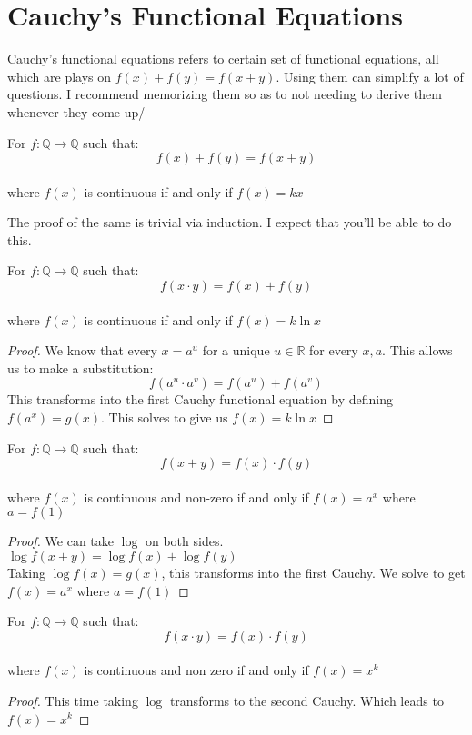 \section{Cauchy's Functional Equations}
Cauchy's functional equations refers to certain set of functional equations, all which are plays on $f(x)+f(y)=f(x+y)$. Using them can simplify a lot of questions. I recommend memorizing them so as to not needing to derive them whenever they come up/\\
\begin{theorem}
    For  $f : \mathbb{Q} \to \mathbb{Q}$ such that:\\
    \[f(x)+f(y)=f(x+y)\]\\
where $f(x)$ is continuous if and only if $f(x)=kx$
\end{theorem}
The proof of the same is trivial via induction. I expect that you'll be able to do this.\\
\begin{theorem}
    For  $f : \mathbb{Q} \to \mathbb{Q}$ such that:\\
    \[f(x \cdot y)=f(x)+f(y)\]\\
where $f(x)$ is continuous if and only if $f(x)=k \ln{x}$
\end{theorem}
\begin{proof}
    We know that every $x=a^u$ for a unique $u\in \mathbb{R}$  for every $x,a$. This allows us to make a substitution:\\
    \[ f(a^u \cdot a^v)=f(a^u)+f(a^v)\]
    This transforms into the first Cauchy functional equation by defining $f(a^x)=g(x)$. This solves to give us $f(x)=k\ln{x}$
\end{proof}
\begin{theorem}
    For  $f : \mathbb{Q} \to \mathbb{Q}$ such that:\\
    \[f(x + y)=f(x)\cdot f(y)\]\\
where $f(x)$ is continuous and non-zero if and only if $f(x)=a^x$ where $a=f(1)$
\end{theorem}
\begin{proof}
    We can take $\log$ on both sides.\\
    $\log{f(x+y)}=\log{f(x)}+\log{f(y)}$\\
    Taking $\log{f(x)}=g(x)$, this transforms into the first Cauchy. We solve to get $f(x)=a^x$ where $a=f(1)$
\end{proof}
\begin{theorem}
    For  $f : \mathbb{Q} \to \mathbb{Q}$ such that:\\
    \[f(x \cdot y)=f(x)\cdot f(y)\]\\
where $f(x)$ is continuous and non zero if and only if $f(x)=x^k$
\end{theorem}
\begin{proof}
    This time taking $\log$ transforms to the second Cauchy. Which leads to $f(x)=x^k$
\end{proof}
